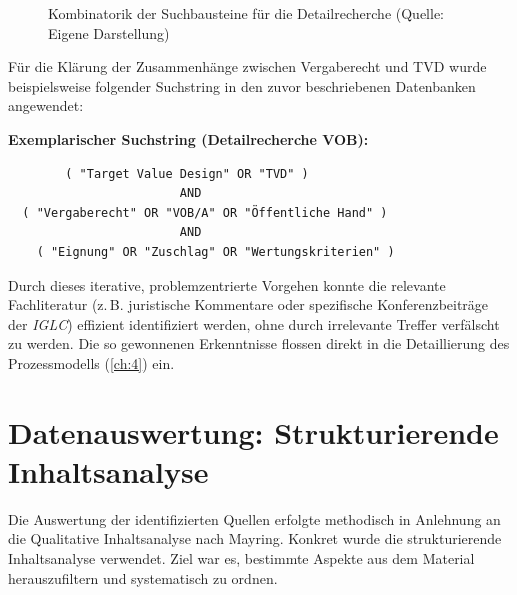 \begin{figure}[hbt!]
\caption{Kombinatorik der Suchbausteine für die Detailrecherche (Quelle: Eigene Darstellung)}
\label{fig:suchlogik_grafik}
\end{figure}

Für die Klärung der Zusammenhänge zwischen Vergaberecht und \acl{TVD} wurde beispielsweise folgender Suchstring in den zuvor beschriebenen Datenbanken angewendet:



\begin{center}
\textbf{Exemplarischer Suchstring (Detailrecherche \acs{VOB}):}\\[1.5em]

\begin{BVerbatim}
        ( "Target Value Design" OR "TVD" )
                        AND 
  ( "Vergaberecht" OR "VOB/A" OR "Öffentliche Hand" )
                        AND 
    ( "Eignung" OR "Zuschlag" OR "Wertungskriterien" )
\end{BVerbatim}
\end{center}

Durch dieses iterative, problemzentrierte Vorgehen konnte die relevante Fachliteratur (z.\,B. juristische Kommentare oder spezifische Konferenzbeiträge der \textit{IGLC}) effizient identifiziert werden, ohne durch irrelevante Treffer verfälscht zu werden. Die so gewonnenen Erkenntnisse flossen direkt in die Detaillierung des Prozessmodells (\cref{ch:4}) ein.

\section{Datenauswertung: Strukturierende Inhaltsanalyse}
\label{sec:3.3}

Die Auswertung der identifizierten Quellen erfolgte methodisch in Anlehnung an die Qualitative Inhaltsanalyse nach Mayring. 
Konkret wurde die strukturierende Inhaltsanalyse verwendet. Ziel war es, bestimmte Aspekte aus dem Material herauszufiltern und systematisch zu ordnen.\autocite[Vgl.][S.~66]{mayring_qualitative_2022}

